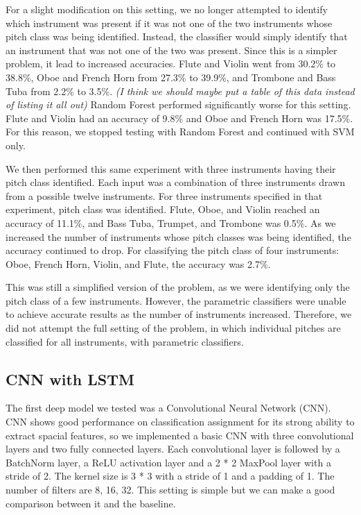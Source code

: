 \documentclass{article}
\begin{document}
For a slight modification on this setting, we no longer attempted to identify which instrument was present if it was not one of the two instruments whose pitch class was being identified. Instead, the classifier would simply identify that an instrument that was not one of the two was present. Since this is a simpler problem, it lead to increased accuracies. Flute and Violin went from 30.2\% to 38.8\%, Oboe and French Horn from 27.3\% to 39.9\%, and Trombone and Bass Tuba from 2.2\% to 3.5\%. \textit{(I think we should maybe put a table of this data instead of listing it all out)} Random Forest performed significantly worse for this setting. Flute and Violin had an accuracy of 9.8\% and Oboe and French Horn was 17.5\%. For this reason, we stopped testing with Random Forest and continued with SVM only.

We then performed this same experiment with three instruments having their pitch class identified. Each input was a combination of three instruments drawn from a possible twelve instruments. For three instruments specified in that experiment, pitch class was identified. Flute, Oboe, and Violin reached an accuracy of 11.1\%, and Bass Tuba, Trumpet, and Trombone was 0.5\%. As we increased the number of instruments whose pitch classes was being identified, the accuracy continued to drop. For classifying the pitch class of four instruments: Oboe, French Horn, Violin, and Flute, the accuracy was 2.7\%.

This was still a simplified version of the problem, as we were identifying only the pitch class of a few instruments. However, the parametric classifiers were unable to achieve accurate results as the number of instruments increased. Therefore, we did not attempt the full setting of the problem, in which individual pitches are classified for all instruments, with parametric classifiers. 


\subsection{CNN with LSTM}

The first deep model we tested was a Convolutional Neural Network (CNN). CNN shows good performance on classification assignment for its strong ability to extract spacial features, so we implemented a basic CNN with three convolutional layers and two fully connected layers. Each convolutional layer is followed by a BatchNorm layer, a ReLU activation layer and a 2 * 2  MaxPool layer with a stride of 2. The kernel size is 3 * 3 with a stride of 1 and a padding of 1. The number of filters are 8, 16, 32. This setting is simple but we can make a good comparison between it and the baseline. \\
\end{document}
